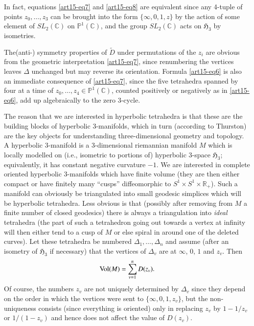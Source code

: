 In fact, equations \eqref{art15-eq7} and \eqref{art15-eq8} are equivalent since any 4-tuple of points $z_{0},\ldots,z_{3}$ can be brought into the form $\{\infty,0,1,z\}$ by the action of some element of $SL_{2}(\mathbb{C})$ on $\mathbb{P}^{1}(\mathbb{C})$, and the group $SL_{2}(\mathbb{C})$ acts on $\mathfrak{H}_{3}$ by isometries.

The\pageoriginale (anti-) symmetry properties of $\widetilde{D}$ under permutations of the $z_{i}$ are obvious from the geometric interpretation \eqref{art15-eq7}, since renumbering the vertices leaves $\Delta$ unchanged but may reverse its orientation. Formula \eqref{art15-eq6} is also an immediate consequence of \eqref{art15-eq7}, since the five tetrahedra spanned by four at a time of $z_{0},\ldots,z_{4}\in \mathbb{P}^{1}(\mathbb{C})$, counted positively or negatively as in \eqref{art15-eq6}, add up algebraically to the zero 3-cycle.

The reason that we are interested in hyperbolic tetrahedra is that these are the building blocks of hyperbolic 3-manifolds, which in turn (according to Thurston) are the key objects for understanding three-dimensional geometry and topology. A hyperbolic 3-manifold is a 3-dimensional riemannian manifold $M$ which is locally modelled on (i.e., isometric to portions of) hyperbolic 3-space $\mathfrak{H}_{3}$; equivalently, it has constant negative curvature $-1$. We are interested in complete oriented hyperbolic 3-manifolds which have finite volume (they are then either compact or have finitely many ``cusps'' diffeomorphic to $S^{1}\times S^{1}\times \mathbb{R}_{+}$). Such a manifold can obviously be triangulated into small geodesic simplices which will be hyperbolic tetrahedra. Less obvious is that (possibly after removing from $M$ a finite number of closed geodesics) there is always a triangulation into {\em ideal} tetrahedra (the part of such a tetrahedron going out towards a vertex at infinity will then either tend to a cusp of $M$ or else spiral in around one of the deleted curves). Let these tetrahedra be numbered $\Delta_{1},\ldots,\Delta_{n}$ and assume (after an isometry of $\mathfrak{H}_{3}$ if necessary) that the vertices of $\Delta_{v}$ are at $\infty$, $0$, $1$ and $z_{v}$. Then
\begin{equation}
\operatorname{Vol} (M)=\sum\limits^{n}_{v=1}D(z_{v}).\label{art15-eq9}
\end{equation}
Of course, the numbers $z_{v}$ are not uniquely determined by $\Delta_{v}$ since they depend on the order in which the vertices were sent to $\{\infty,0,1,z_{v}\}$, but the non-uniqueness consists (since everything is oriented) only in replacing $z_{v}$ by $1-1/z_{v}$ or $1/(1-z_{v})$ and hence does not affect the value of $D(z_{v})$.

